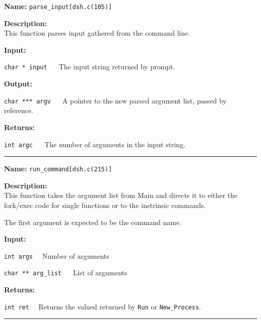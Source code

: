 \documentclass[11pt,a4paper]{article}
\begin{document}
\begin{description}
\item \textbf{Name:} 
\verb|parse_input[dsh.c(105)]|

\item \textbf{Description:}\\
This function parses input gathered from the command line.

\item \textbf{Input:}
\begin{description}
\item \verb|char * input| ~~ The input string returned by prompt.
\end{description}

\item \textbf{Output:}
\begin{description}
\item \verb|char *** argv| ~~ A pointer to the new parsed argument list, passed by reference.
\end{description}

\item \textbf{Returns:}
\begin{description}
\item \verb|int argc| ~~ The number of arguments in the input string.
\end{description}
\end{description}\hrule

\begin{description}
\item \textbf{Name:} 
\verb|run_command[dsh.c(215)]|

\item \textbf{Description:}\\
This function takes the argument list from Main and directs it to either the
 fork/exec code for single functions or to the instrinsic commands.

The first argument is expected to be the command name. 

\item \textbf{Input:}
\begin{description}
\item \verb|int args|~~ Number of arguments
\item \verb|char ** arg_list| ~~ List of arguments
\end{description}

\item \textbf{Returns:}
\begin{description}
\item \verb|int ret|~~ Returns the valued returned by \verb|Run| or \verb|New_Process|.
\end{description}
\end{description}\hrule
\end{document}
